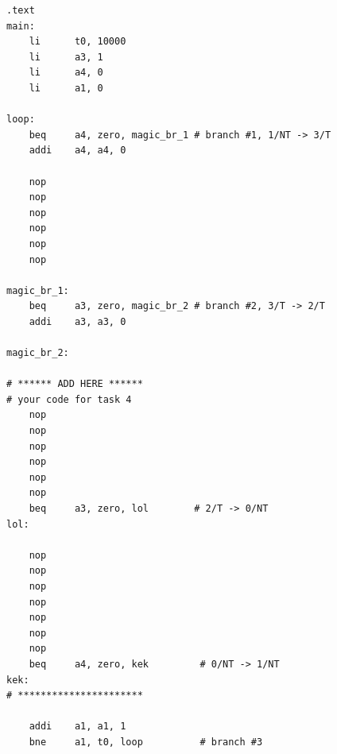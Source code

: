 \documentclass[14pt,a4paper]{extarticle}
\begin{document}
\begin{verbatim}
.text
main:
    li      t0, 10000
    li      a3, 1
    li      a4, 0
    li      a1, 0

loop:
    beq     a4, zero, magic_br_1 # branch #1, 1/NT -> 3/T
    addi    a4, a4, 0

    nop
    nop
    nop
    nop
    nop
    nop

magic_br_1:
    beq     a3, zero, magic_br_2 # branch #2, 3/T -> 2/T
    addi    a3, a3, 0

magic_br_2:

# ****** ADD HERE ******
# your code for task 4
    nop
    nop
    nop
    nop
    nop
    nop
    beq     a3, zero, lol        # 2/T -> 0/NT
lol:
    
    nop
    nop
    nop
    nop
    nop
    nop
    nop
    beq     a4, zero, kek         # 0/NT -> 1/NT
kek:
# **********************

    addi    a1, a1, 1
    bne     a1, t0, loop          # branch #3

\end{verbatim}
\end{document}
